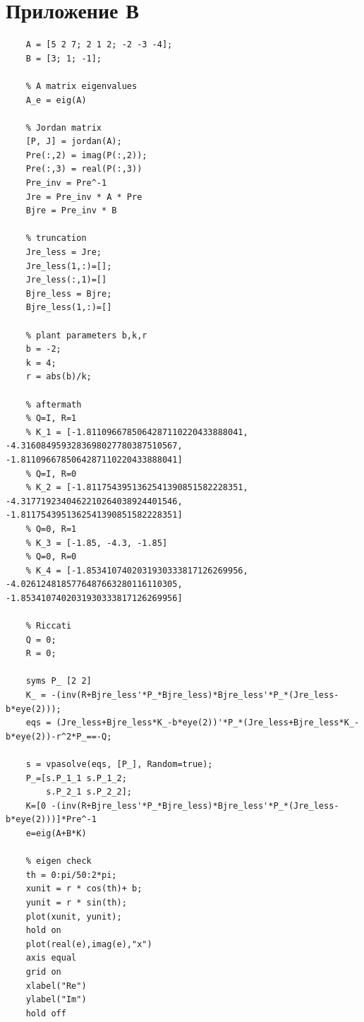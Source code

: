 \documentclass[a4paper, 12pt]{article}
\begin{document}
    \section{Приложение В}
    \begin{lstlisting}[label=task3code, caption={Программа для третьего задания}]
    % plant parameters
    A = [5 2 7; 2 1 2; -2 -3 -4];
    B = [3; 1; -1];

    % A matrix eigenvalues
    A_e = eig(A)

    % Jordan matrix
    [P, J] = jordan(A);
    Pre(:,2) = imag(P(:,2));
    Pre(:,3) = real(P(:,3))
    Pre_inv = Pre^-1
    Jre = Pre_inv * A * Pre
    Bjre = Pre_inv * B

    % truncation
    Jre_less = Jre;
    Jre_less(1,:)=[];
    Jre_less(:,1)=[]
    Bjre_less = Bjre;
    Bjre_less(1,:)=[]

    % plant parameters b,k,r
    b = -2;
    k = 4;
    r = abs(b)/k;

    % aftermath
    % Q=I, R=1
    % K_1 = [-1.8110966785064287110220433888041, -4.3160849593283698027780387510567, -1.8110966785064287110220433888041]
    % Q=I, R=0
    % K_2 = [-1.8117543951362541390851582228351, -4.3177192340462210264038924401546, -1.8117543951362541390851582228351]
    % Q=0, R=1
    % K_3 = [-1.85, -4.3, -1.85]
    % Q=0, R=0
    % K_4 = [-1.8534107402031930333817126269956, -4.0261248185776487663280116110305, -1.8534107402031930333817126269956]

    % Riccati
    Q = 0;
    R = 0;

    syms P_ [2 2]
    K_ = -(inv(R+Bjre_less'*P_*Bjre_less)*Bjre_less'*P_*(Jre_less-b*eye(2)));
    eqs = (Jre_less+Bjre_less*K_-b*eye(2))'*P_*(Jre_less+Bjre_less*K_-b*eye(2))-r^2*P_==-Q;

    s = vpasolve(eqs, [P_], Random=true);
    P_=[s.P_1_1 s.P_1_2;
        s.P_2_1 s.P_2_2];
    K=[0 -(inv(R+Bjre_less'*P_*Bjre_less)*Bjre_less'*P_*(Jre_less-b*eye(2)))]*Pre^-1
    e=eig(A+B*K)

    % eigen check
    th = 0:pi/50:2*pi;
    xunit = r * cos(th)+ b;
    yunit = r * sin(th);
    plot(xunit, yunit);
    hold on
    plot(real(e),imag(e),"x")
    axis equal
    grid on
    xlabel("Re")
    ylabel("Im")
    hold off
    \end{lstlisting}
\end{document}
